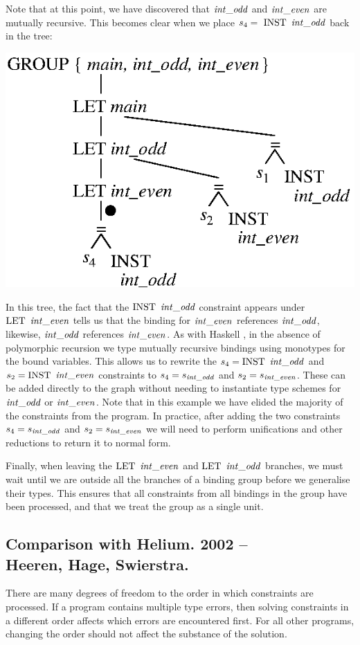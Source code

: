 Note that at this point, we have discovered that $\operatorname{\mathit{int\_odd}}$ and $\operatorname{\mathit{int\_even}}$ are mutually recursive. This becomes clear when we place $s_4 = \ \rINST \ \iintOdd$ back in the tree:
\begin{center}
\includegraphics{3-Inference/fig/ordering/tree-inteven-moved}
\end{center}

\clearpage{}
In this tree, the fact that the $\rINST \ \iintOdd$ constraint appears under $\rLET \ \iintEven$ tells us that the binding for $\operatorname{\mathit{int\_even}}$ references $\operatorname{\mathit{int\_odd}}$, likewise, $\operatorname{\mathit{int\_odd}}$ references $\operatorname{\mathit{int\_even}}$. As with Haskell \cite{jones:typing-haskell}, in the absence of polymorphic recursion we type mutually recursive bindings using monotypes for the bound variables. This allows us to rewrite the $s_4 = \textrm{INST} \ \operatorname{\mathit{int\_odd}}$ and $s_2 = \textrm{INST} \ \operatorname{\mathit{int\_even}}$ constraints to $s_4 = s_{\operatorname{\mathit{int\_odd}}}$ and $s_2 = s_{\operatorname{\mathit{int\_even}}}$. These can be added directly to the graph without needing to instantiate type schemes for $\operatorname{\mathit{int\_odd}}$ or $\operatorname{\mathit{int\_even}}$. Note that in this example we have elided the majority of the constraints from the program. In practice, after adding the two constraints $s_4 = s_{\operatorname{\mathit{int\_odd}}}$ and $s_2 = s_{\operatorname{\mathit{int\_even}}}$ we will need to perform unifications and other reductions to return it to normal form. 

Finally, when leaving the $\rLET \ \iintEven$ and $\rLET \ \iintOdd$ branches, we must wait until we are outside all the branches of a binding group before we generalise their types. This ensures that all constraints from all bindings in the group have been processed, and that we treat the group as a single unit. 



\subsection{Comparison with Helium. 2002 -- \\
 Heeren, Hage, Swierstra.}
There are many degrees of freedom to the order in which constraints are processed. If a program contains multiple type errors, then solving constraints in a different order affects which errors are encountered first. For all other programs, changing the order should not affect the substance of the solution.

